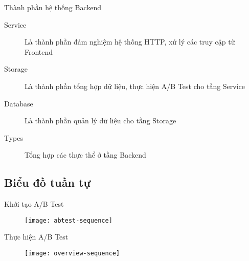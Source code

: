 \begin{frame}{Thành phần hệ thống Backend}
	\begin{description}
		\item[Service] Là thành phần đảm nghiệm hệ thống HTTP, xử lý các truy cập từ Frontend
		\item[Storage] Là thành phần tổng hợp dữ liệu, thực hiện A/B Test cho tầng Service
		\item[Database] Là thành phần quản lý dữ liệu cho tầng Storage
		\item[Types] Tổng hợp các thực thể ở tầng Backend
	\end{description}
\end{frame}


\subsection{Biểu đồ tuần tự}

\begin{frame}{Khởi tạo A/B Test}
	\begin{figure}
		\texttt{[image: abtest-sequence]}
	\end{figure}
\end{frame}

\begin{frame}{Thực hiện A/B Test}
	\begin{figure}
		\texttt{[image: overview-sequence]}
	\end{figure}
\end{frame}
